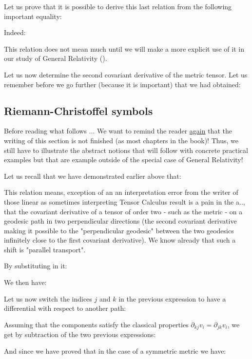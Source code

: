 	Let us prove that it is possible to derive this last relation from the following important equality:
	
	Indeed:
	
	This relation does not mean much until we will make a more explicit use of it in our study of General Relativity ().

	Let us now determine the second covariant derivative of the metric tensor. Let us remember before we go further (because it is important) that we had obtained:
	
	
	\subsection{Riemann-Christoffel symbols}\label{Riemann-Christoffel symbols}
	\begin{tcolorbox}[colback=red!5,borderline={1mm}{2mm}{red!5},arc=0mm,boxrule=0pt]
	\bcbombe Before reading what follows ... We want to remind the reader \underline{again} that the writing of this section is not finished (as most chapters in the book)! Thus, we still have to illustrate the abstract notions that will follow with concrete practical examples but that are example outside of the special case of General Relativity!
	\end{tcolorbox}
	
	Let us recall that we have demonstrated earlier above that:
	
	This relation means, exception of an an interpretation error from the writer of those linear as sometimes interpreting Tensor Calculus result is a pain in the a.., that the covariant derivative of a tensor of order two - such as the metric - on a geodesic path in two perpendicular directions (the second covariant derivative making it possible to the "perpendicular geodesic" between the two geodesics infinitely close to the first covariant derivative). We know already that such a shift is "parallel transport".
	
	By substituting in it:
	
	We then have:
	
	Let us now switch the indices $j$ and $k$ in the previous expression to have a differential with respect to another path:
	
	Assuming that the components satisfy the classical properties $\partial_{kj}v_i=\partial_{jk}v_i$, we get by subtraction of the two previous expressions:
	
	And since we have proved that in the case of a symmetric metric we have:
	
